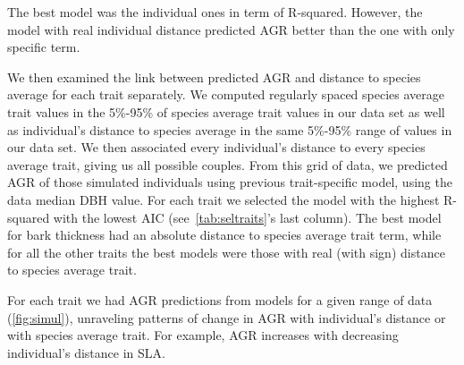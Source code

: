 The best model was the individual ones in term of R-squared. However, the model with real individual distance predicted AGR better than the one with only specific term.

We then examined the link between predicted AGR and distance to species average for each trait separately. We computed regularly spaced species average trait values in the 5\%-95\% of species average trait values in our data set as well as individual's distance to species average in the same 5\%-95\% range of values in our data set. We then associated every individual's distance to every species average trait, giving us all possible couples. From this grid of data, we predicted AGR of those simulated individuals using previous trait-specific model, using the data median DBH value. For each trait we selected the model with the highest R-squared with the lowest AIC (see~\autoref{tab:seltraits}'s last column). The best model for bark thickness had an absolute distance to species average trait term, while for all the other traits the best models were those with real (with sign) distance to species average trait.

For each trait we had AGR predictions from models for a given range of data (\autoref{fig:simul}), unraveling patterns of change in AGR with individual's distance or with species average trait. For example, AGR increases with decreasing individual's distance in SLA.

